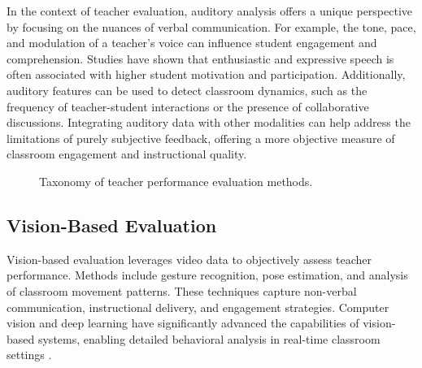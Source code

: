 In the context of teacher evaluation, auditory analysis offers a unique perspective by focusing on the nuances of verbal communication. For example, the tone, pace, and modulation of a teacher's voice can influence student engagement and comprehension. Studies have shown that enthusiastic and expressive speech is often associated with higher student motivation and participation. Additionally, auditory features can be used to detect classroom dynamics, such as the frequency of teacher-student interactions or the presence of collaborative discussions. Integrating auditory data with other modalities can help address the limitations of purely subjective feedback, offering a more objective measure of classroom engagement and instructional quality.

\begin{figure}[t]
    \centering
    \centering
    \caption{Taxonomy of teacher performance evaluation methods.}
    \label{fig:taxonomy}
\end{figure}

\subsection{Vision-Based Evaluation}
Vision-based evaluation leverages video data to objectively assess teacher performance. Methods include gesture recognition, pose estimation, and analysis of classroom movement patterns. These techniques capture non-verbal communication, instructional delivery, and engagement strategies. Computer vision and deep learning have significantly advanced the capabilities of vision-based systems, enabling detailed behavioral analysis in real-time classroom settings \cite{10.1007/978-981-99-9109-9_7, hou2024encouragement, Lin2021, AFSAR20156935, 10050049, YE2023108915}.

